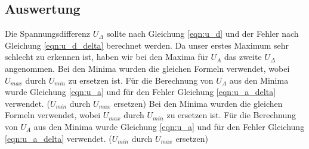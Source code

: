 \documentclass[12pt,a4paper]{article}
\begin{document}
\subsection{Auswertung}
Die Spannungsdifferenz $U_\Delta$ sollte nach Gleichung \ref{eqn:u_d} und der Fehler nach Gleichung \ref{eqn:u_d_delta} berechnet werden.
Da unser erstes Maximum sehr schlecht zu erkennen ist, haben wir bei den Maxima für $U_A$ das zweite $U_\Delta$ angenommen.
Bei den Minima wurden die gleichen Formeln verwendet, wobei $U_{max}$ durch $U_{min}$ zu ersetzen ist. Für die Berechnung von $U_A$ aus den Minima wurde Gleichung \ref{eqn:u_a} und für den Fehler Gleichung \ref{eqn:u_a_delta} verwendet. ($U_{min}$ durch $U_{max}$ ersetzen)
Bei den Minima wurden die gleichen Formeln verwendet, wobei $U_{max}$ durch $U_{min}$ zu ersetzen ist. Für die Berechnung von $U_A$ aus den Minima wurde Gleichung \ref{eqn:u_a} und für den Fehler Gleichung \ref{eqn:u_a_delta} verwendet. ($U_{min}$ durch $U_{max}$ ersetzen)
\end{document}

